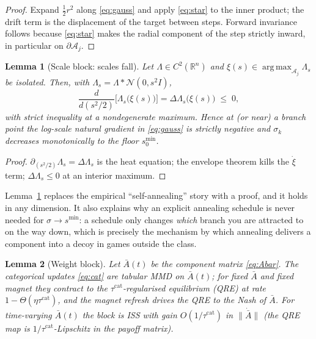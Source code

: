 \documentclass[11pt]{article}
\newtheorem{lemma}{Lemma}
\theoremstyle{definition}
\newcommand{\R}{\mathbb{R}}
\newcommand{\cA}{\mathcal{A}}
\newcommand{\cN}{\mathcal{N}}
\DeclareMathOperator*{\argmax}{arg\,max}
\begin{document}
\begin{proof}
Expand $\tfrac12 r^2$ along \eqref{eq:gauss} and apply \eqref{eq:star} to the
inner product; the drift term is the displacement of the target between steps.
Forward invariance follows because \eqref{eq:star} makes the radial component of
the step strictly inward, in particular on $\partial \cA_j$.
\end{proof}

\begin{lemma}[Scale block: scales fall]\label{lem:scale}
Let $\Lambda \in C^2(\R^n)$ and $\xi(s) \in \argmax_{\cA_j} \Lambda_s$ be
isolated. Then, with $\Lambda_s = \Lambda * \cN(0,s^2 I)$,
\begin{equation}
  \frac{d}{d(s^2/2)}\Big[\Lambda_s\big(\xi(s)\big)\Big]
  = \Delta \Lambda_s\big(\xi(s)\big) \;\le\; 0,
\end{equation}
with strict inequality at a nondegenerate maximum. Hence at (or near) a branch
point the log-scale natural gradient in \eqref{eq:gauss} is strictly negative and
$\sigma_k$ decreases monotonically to the floor $s^{\min}_0$.
\end{lemma}

\begin{proof}
$\partial_{(s^2/2)} \Lambda_s = \Delta \Lambda_s$ is the heat equation; the
envelope theorem kills the $\dot\xi$ term; $\Delta \Lambda_s \le 0$ at an interior
maximum.
\end{proof}

Lemma~\ref{lem:scale} replaces the empirical ``self-annealing'' story with a
proof, and it holds in any dimension. It also explains why an explicit annealing
schedule is never needed for $\sigma \to s^{\min}$: a schedule only changes
\emph{which} branch you are attracted to on the way down, which is precisely the
mechanism by which annealing delivers a component into a decoy in games outside
the class.

\begin{lemma}[Weight block]\label{lem:weight}
Let $\bar A(t)$ be the component matrix \eqref{eq:Abar}. The categorical updates
\eqref{eq:cat} are tabular MMD on $\bar A(t)$; for fixed $\bar A$ and fixed
magnet they contract to the $\tau^{\mathrm{cat}}$-regularised equilibrium (QRE) at
rate $1 - \Theta(\eta\tau^{\mathrm{cat}})$, and the magnet refresh drives the QRE
to the Nash of $\bar A$. For time-varying $\bar A(t)$ the block is ISS with gain
$O(1/\tau^{\mathrm{cat}})$ in $\|\dot{\bar A}\|$ (the QRE map is
$1/\tau^{\mathrm{cat}}$-Lipschitz in the payoff matrix).
\end{lemma}
\end{document}
